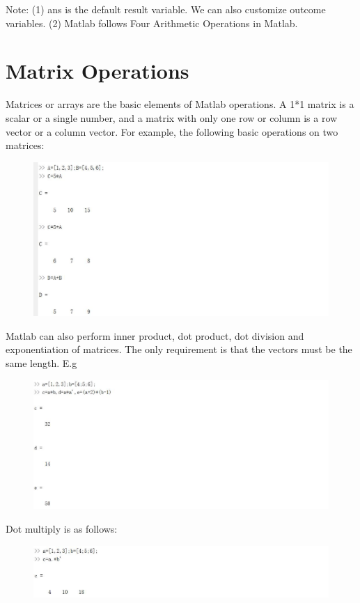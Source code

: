 \documentclass[10pt,math=newtx,citestyle=gb7714-2015,bibstyle=gb7714-2015]{elegantbook}
\begin{document}
{{{	Note: (1) ans is the default result variable. We can also customize outcome variables. (2) Matlab follows Four Arithmetic Operations in Matlab.
	
	\section{Matrix Operations}
	
	Matrices or arrays are the basic elements of Matlab operations. A 1*1 matrix is a scalar or a single number, and a matrix with only one row or column is a row vector or a column vector. For example, the following basic operations on two matrices:
	\begin{figure}[htbp!]
		\centering
		\includegraphics[width=0.8\linewidth]{FIG/matrixcalcu.jpg}
		
	\end{figure}
	
	Matlab can also perform inner product, dot product, dot division and exponentiation of matrices. The only requirement is that the vectors must be the same length. E.g
	\begin{figure}[htbp!]
		\centering
		\includegraphics[width=0.8\linewidth]{FIG/innerprod.jpg}
		
	\end{figure}
	
	Dot multiply is as follows:
	\begin{figure}[htbp!]
		\centering
		\includegraphics[width=0.8\linewidth]{FIG/dotprod.jpg}
		\centering
	\end{figure}
	
}}}
\end{document}
